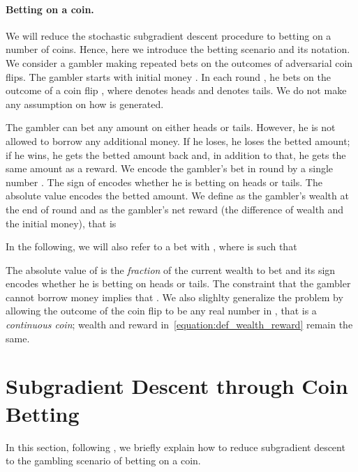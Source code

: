 \documentclass{article}
\begin{document}
\paragraph{Betting on a coin.}
We will reduce the stochastic subgradient descent procedure to betting on a number of coins. Hence, here we introduce the betting scenario and its notation. We consider a gambler making repeated bets on the
outcomes of adversarial coin flips. The gambler starts with initial
money . In each round , he bets on the outcome of a coin
flip , where  denotes heads and  denotes tails.  We
do not make any assumption on how  is generated.

The gambler can bet any amount on either heads or tails. However, he is not
allowed to borrow any additional money. If he loses, he loses the betted
amount; if he wins, he gets the betted amount back and, in addition to that, he
gets the same amount as a reward.  We encode the gambler's bet in round  by
a single number . The sign of  encodes whether he is betting on heads
or tails. The absolute value encodes the betted amount.  We define 
as the gambler's wealth at the end of round  and  as the
gambler's net reward (the difference of wealth and the initial money), that is

In the following, we will also refer to a bet with , where 
is such that

The absolute value of  is the \emph{fraction} of the current wealth to
bet and its sign encodes whether he is betting on heads or tails. The
constraint that the gambler cannot borrow money implies that .
We also slighlty generalize the problem by allowing the outcome of the coin flip
 to be any real number in , that is a \emph{continuous coin}; wealth and reward in~\eqref{equation:def_wealth_reward} remain the same.
 \section{Subgradient Descent through Coin Betting}
\label{sec:coin}

In this section, following \citet{OrabonaP16b}, we briefly explain how to reduce subgradient 
descent to the gambling scenario of betting on a coin.
\end{document}
